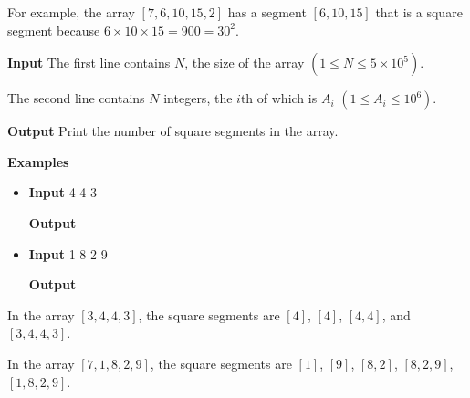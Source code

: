 \normalfont\documentclass[letterpaper,11pt]{article}
\begin{document}
For example, the array $[7,6,10,15,2]$ has a segment $[6,10,15]$ that is a square segment because $6 \times 10 \times 15 = 900 = 30^2$.

\textbf{Input} \newline
The first line contains $N$, the size of the array $(1 \leq N \leq 5 \times 10^5)$.

The second line contains $N$ integers, the $i$th of which is $A_i$ $(1 \leq A_i \leq 10^6)$.

\textbf{Output} \newline
Print the number of square segments in the array.

\textbf{Examples}
\begin{itemize}
\item \textbf{Input}   4 4 3

\textbf{Output} 


\item \textbf{Input}   1 8 2 9

\textbf{Output	} 
\end{itemize}

In the array $[3,4,4,3]$, the square segments are $[4]$, $[4]$, $[4,4]$, and $[3,4,4,3]$.

In the array $[7,1,8,2,9]$, the square segments are $[1]$, $[9]$, $[8,2]$, $[8,2,9]$, $[1,8,2,9]$.
\end{document}
